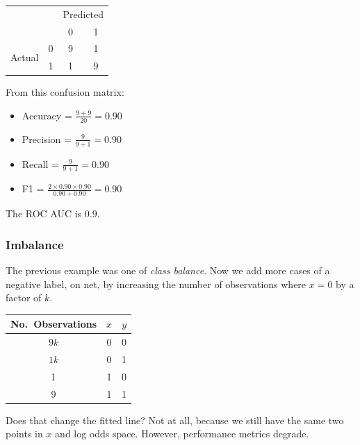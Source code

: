 \begin{center}
\begin{tabular}{cc|cc}
& & \multicolumn{2}{c}{Predicted} \\
& & 0 & 1 \\
\midrule
\multirow{2}{*}{Actual} & 0 & 9 & 1 \\
& 1 & 1 & 9 \\
\end{tabular}
\end{center}

From this confusion matrix:
\begin{itemize}
\item Accuracy = $\frac{9 + 9}{20} = 0.90$
\item Precision = $\frac{9}{9 + 1} = 0.90$ 
\item Recall = $\frac{9}{9 + 1} = 0.90$
\item F1 = $\frac{2 \times 0.90 \times 0.90}{0.90 + 0.90} = 0.90$
\end{itemize}

The ROC AUC is $0.9$.

\begin{center}%
\end{center}

\subsubsection{Imbalance}

The previous example was one of \emph{class balance}. Now we add more cases of a negative label, on net, by increasing the number of observations where $x=0$ by a factor of $k$.

\begin{center}
\begin{tabular}{ccc}
\toprule 
No.\ Observations & $x$ & $y$ \\
\midrule
$9k$ & 0 & 0 \\
$1k$ & 0 & 1 \\
1 & 1 & 0 \\
9 & 1 & 1 \\
\bottomrule
\end{tabular}
\end{center}


Does that change the fitted line? Not at all, because we still have the same two points in $x$ and log odds space. However, performance metrics degrade. 




